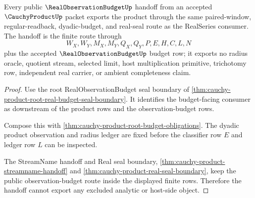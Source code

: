 \begin{theorem}
\label{thm:cauchy-product-public-observation-budget-export}
Every public $\RealObservationBudgetUp$ handoff from an accepted $\CauchyProductUp$ packet exports the product through the same paired-window, regular-readback, dyadic-budget, and real-seal route as the RealSeries consumer. The handoff is the finite route through
$$
W_X,W_Y,M_X,M_Y,Q_X,Q_Y,P,E,H,C,L,N
$$
plus the accepted $\RealObservationBudgetUp$ budget row; it exports no radius oracle, quotient stream, selected limit, host multiplication primitive, trichotomy row, independent real carrier, or ambient completeness claim.
\end{theorem}
\begin{proof}
Use the root RealObservationBudget seal boundary of \autoref{thm:cauchy-product-root-real-budget-seal-boundary}. It identifies the budget-facing consumer as downstream of the product rows and the observation-budget rows.

Compose this with \autoref{thm:cauchy-product-root-budget-obligations}. The dyadic product observation and radius ledger are fixed before the classifier row $E$ and ledger row $L$ can be inspected.

The StreamName handoff and Real seal boundary, \autoref{thm:cauchy-product-streamname-handoff} and \autoref{thm:cauchy-product-real-seal-boundary}, keep the public observation-budget route inside the displayed finite rows. Therefore the handoff cannot export any excluded analytic or host-side object.
\end{proof}

